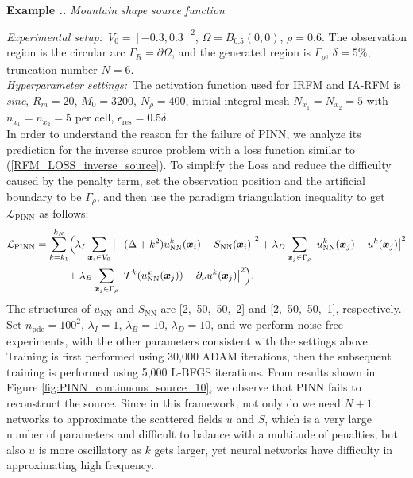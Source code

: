 \documentclass{article}
\theoremstyle{plain}
\theoremstyle{definition}
\newcounter{example}[section]         %
\renewcommand{\theexample}{\thesection.\arabic{example}}
\newenvironment{example}[1][]{
    \refstepcounter{example}%
    \par\noindent\textbf{Example \theexample.} #1 \par
}{\par}
\begin{document}
{\begin{example}[\emph{Mountain shape source function}]
\noindent\emph{Experimental setup:}\ $V_0=[-0.3, 0.3]^2$,  $\Omega=B_{0.5
    }(0, 0)$, $\rho=0.6$.  The observation region is the circular arc $\Gamma_{R}=\partial \Omega$, and the generated region is $\Gamma_{\rho}$, $\delta=5\%$, truncation number $N=6$.\\
\noindent\emph{Hyperparameter settings:}\  The activation function used for IRFM and IA-RFM is {\it sine}, $R_m=20$, $M_0=3200$,  $ {N_{\rho}}=400$,  initial integral mesh $ {N_{x_1}}= {N_{x_2}}=5$  with  $ {n_{x_1}}= {n_{x_2}}=5$ per cell, $\epsilon_{\text{res}}=0.5\delta$.\\

In order to understand the reason for the failure of PINN, we analyze its prediction for the inverse source problem with a loss function similar to (\ref{RFM_LOSS_inverse_source}). To simplify the Loss and reduce the difficulty caused by the penalty term, set the observation position and the artificial boundary to be $\Gamma_{\rho}$, and then use the paradigm triangulation inequality to get $\mathcal{L}_{\text{PINN}}$ as follows: 
\begin{align}
    \label{PINN_LOSS_inverse_source}
\mathcal{L}_{\text{PINN}}&=\sum_{k=k_1}^{k_N}
\Bigl( \lambda_ {I} \sum_{\boldsymbol{x}_i \in V_0}\left|-(\Delta+k^2) u_\text{NN}^{k}(\boldsymbol{x}_i)-S_\text{NN}(\boldsymbol{x}_i)\right|^2
+ \lambda_{D}\sum_{\boldsymbol{x}_j\in \Gamma_{\rho}}\left|u^{k}_\text{NN}(\boldsymbol{x}_j)-u^{k}(\boldsymbol{x}_j)\right|^2 
\notag\\
&{}\qquad\quad +\lambda_{B}\sum_{\boldsymbol{x}_j\in \Gamma_{\rho}}\left|\mathcal{T}^{k}(u^{k}_\text{NN}(\boldsymbol{x}_j))-\partial_{\nu}u^{k}(\boldsymbol{x}_j)\right|^2 \Bigr).
\end{align}
The structures of $u_\text{NN}$ and $S_\text{NN}$ are [2,\ 50,\ 50,\ 2] and [2,\ 50,\ 50,\ 1], respectively. Set $n_{\text{pde}}=100^2$, $\lambda_{I}=1$, $\lambda_{B}=10$, $\lambda_{D}=10$, and we perform noise-free experiments, with the other parameters consistent with the settings above. Training is first performed using 30,000 ADAM iterations, then the subsequent training is performed using 5,000 L-BFGS iterations. From results shown in  {Figure \ref{fig:PINN_continuous_source_10}}, we observe that PINN fails to reconstruct the source. Since in this framework, not only do we need $N+1$ networks to approximate the scattered fields $u$ and $S$, which is a very large number of parameters and difficult to balance with a multitude of penalties, but also $u$ is more oscillatory as $k$ gets larger, yet neural networks have difficulty in approximating high frequency.

\end{example}}
\end{document}
